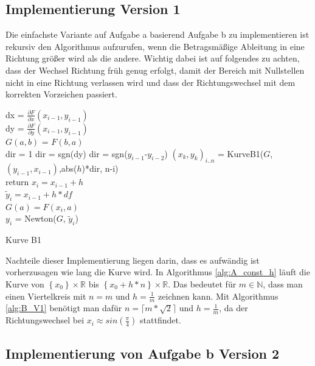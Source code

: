\documentclass[a4paper,11pt,bibliography=totoc,listof=totoc,headinclude=true,cleardoublepage=empty,oneside]{scrartcl}
\newcommand{\diff}[2]{\frac{\partial #1}{\partial #2}}
\begin{document}
\subsection{Implementierung Version 1}
Die einfachste Variante auf Aufgabe a basierend Aufgabe b zu implementieren ist rekursiv den Algorithmus aufzurufen, wenn die Betragsmäßige Ableitung in eine Richtung größer wird als die andere. Wichtig dabei ist auf folgendes zu achten, dass der Wechsel Richtung früh genug erfolgt, damit der Bereich mit Nullstellen nicht in eine Richtung verlassen wird und dass der Richtungswechsel mit dem korrekten Vorzeichen passiert. 
\begin{algorithm}[h]
	\label{alg:B_V1}
	{
		dx = $\diff{F}{x}(x_{i-1},y_{i-1})$\\
		dy = $\diff{F}{y}(x_{i-1},y_{i-1})$\\
		{
			$G(a,b)$ = $F(b,a)$\\
			dir = 1
			{dir = sgn(dy)}
			{dir = sgn($y_{i-1}$-$y_{i-2}$)}
			$(x_k,y_k)_{i..n}$ = KurveB1($G$,$(y_{i-1},x_{i-1})$,abs($h$)*dir, n-i)\\
			return
		}
		{
			$x_i = x_{i-1}+h$\\
			$\tilde y_i = x_{i-1}+h*df$\\
			$G(a) = F(x_i,a)$\\
			$y_i$ = Newton($G$, $\tilde y_i$)
		}
	}
	\caption{Kurve B1}
\end{algorithm}
Nachteile dieser Implementierung liegen darin, dass es aufwändig ist vorherzusagen wie lang die Kurve wird. In Algorithmus \ref{alg:A_const_h} läuft die Kurve von $\left\lbrace x_0\right\rbrace \times\mathbb{R}$ bis $\left\lbrace x_0+h*n\right\rbrace \times\mathbb{R}$. Das bedeutet für $m\in \mathbb{N}$, dass man einen Viertelkreis mit $n=m$ und $h=\frac{1}{m}$ zeichnen kann. Mit Algorithmus \ref{alg:B_V1} benötigt man dafür $n=\lceil m*\sqrt{2}\rceil$ und $h=\frac{1}{m}$, da der Richtungswechsel bei $x_i\approx sin(\frac{\pi}{4})$ stattfindet.
\subsection{Implementierung von Aufgabe b Version 2}
\end{document}
